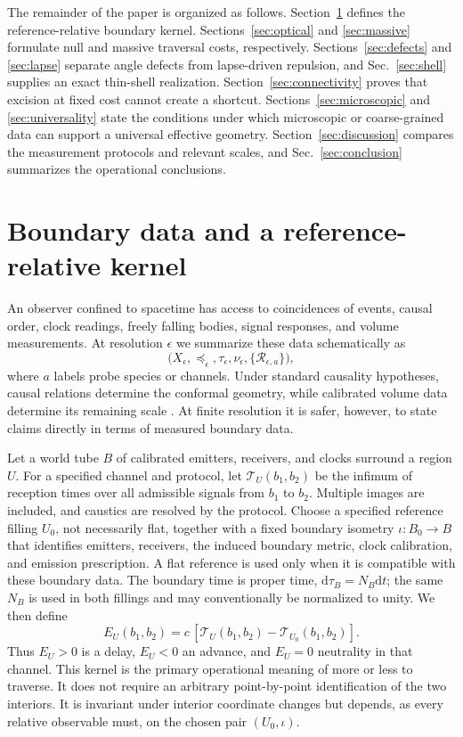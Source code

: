 \documentclass[aps,prd,twocolumn,amsmath,amssymb,nofootinbib]{revtex4-2}
\newcommand{\dd}{\mathrm{d}}
\begin{document}
The remainder of the paper is organized as follows.
Section~\ref{sec:boundary} defines the reference-relative boundary kernel.
Sections~\ref{sec:optical} and \ref{sec:massive} formulate null and massive
traversal costs, respectively.  Sections~\ref{sec:defects} and \ref{sec:lapse}
separate angle defects from lapse-driven repulsion, and
Sec.~\ref{sec:shell} supplies an exact thin-shell realization.
Section~\ref{sec:connectivity} proves that excision at fixed cost cannot create
a shortcut.  Sections~\ref{sec:microscopic} and \ref{sec:universality} state
the conditions under which microscopic or coarse-grained data can support a
universal effective geometry.  Section~\ref{sec:discussion} compares the
measurement protocols and relevant scales, and Sec.~\ref{sec:conclusion}
summarizes the operational conclusions.

\section{Boundary data and a reference-relative kernel}
\label{sec:boundary}

An observer confined to spacetime has access to coincidences of events, causal
order, clock readings, freely falling bodies, signal responses, and volume
measurements.  At resolution $\epsilon$ we summarize these data schematically
as
\begin{equation}
 \bigl(X_{\epsilon},\preceq_{\epsilon},\tau_{\epsilon},
 \nu_{\epsilon},\{\mathcal R_{\epsilon,a}\}\bigr),
\end{equation}
where $a$ labels probe species or channels.  Under standard causality
hypotheses, causal relations determine the conformal geometry, while calibrated
volume data determine its remaining scale
\cite{Malament-1977,hawking-king-mccarthy-1976}.  At finite resolution it is
safer, however, to state claims directly in terms of measured boundary data.

Let a world tube $B$ of calibrated emitters, receivers, and clocks surround a
region $U$.  For a specified channel and protocol, let
$\mathcal T_U(b_1,b_2)$ be the infimum of reception times over all admissible
signals from $b_1$ to $b_2$.  Multiple images are included, and caustics are
resolved by the protocol.  Choose a specified reference filling $U_0$, not
necessarily flat, together with a fixed boundary isometry
$\iota:B_0\rightarrow B$ that identifies emitters, receivers, the induced
boundary metric, clock calibration, and emission prescription.  A flat
reference is used only when it is compatible with these boundary data.  The
boundary time is proper time, $\dd\tau_B=N_B\dd t$; the same $N_B$ is used in
both fillings and may conventionally be normalized to unity.  We then define
\begin{equation}
 E_U(b_1,b_2)
 =c\,[\mathcal T_U(b_1,b_2)-\mathcal T_{U_0}(b_1,b_2)].
 \label{eq:kernel}
\end{equation}
Thus $E_U>0$ is a delay, $E_U<0$ an advance, and $E_U=0$ neutrality in that
channel.  This kernel is the primary operational meaning of more or less to
traverse.  It does not require an arbitrary point-by-point identification of
the two interiors.  It is invariant under interior coordinate changes but
depends, as every relative observable must, on the chosen pair $(U_0,\iota)$.
\end{document}
